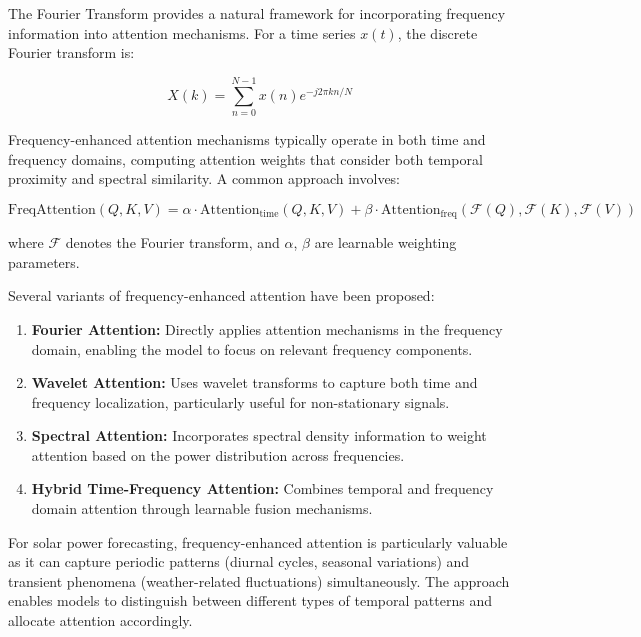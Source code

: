 \documentclass[12pt]{uomthesis}
\begin{document}
The Fourier Transform provides a natural framework for incorporating frequency information into attention mechanisms. For a time series $x(t)$, the discrete Fourier transform is:

\begin{equation}
X(k) = \sum_{n=0}^{N-1} x(n) e^{-j2\pi kn/N}
\end{equation}

Frequency-enhanced attention mechanisms typically operate in both time and frequency domains, computing attention weights that consider both temporal proximity and spectral similarity. A common approach involves:

\begin{equation}
\text{FreqAttention}(Q, K, V) = \alpha \cdot \text{Attention}_{\text{time}}(Q, K, V) + \beta \cdot \text{Attention}_{\text{freq}}(\mathcal{F}(Q), \mathcal{F}(K), \mathcal{F}(V))
\end{equation}

where $\mathcal{F}$ denotes the Fourier transform, and $\alpha$, $\beta$ are learnable weighting parameters.

Several variants of frequency-enhanced attention have been proposed:

\begin{enumerate}
\item \textbf{Fourier Attention:} Directly applies attention mechanisms in the frequency domain, enabling the model to focus on relevant frequency components.

\item \textbf{Wavelet Attention:} Uses wavelet transforms to capture both time and frequency localization, particularly useful for non-stationary signals.

\item \textbf{Spectral Attention:} Incorporates spectral density information to weight attention based on the power distribution across frequencies.

\item \textbf{Hybrid Time-Frequency Attention:} Combines temporal and frequency domain attention through learnable fusion mechanisms.
\end{enumerate}

For solar power forecasting, frequency-enhanced attention is particularly valuable as it can capture periodic patterns (diurnal cycles, seasonal variations) and transient phenomena (weather-related fluctuations) simultaneously. The approach enables models to distinguish between different types of temporal patterns and allocate attention accordingly.
\end{document}
